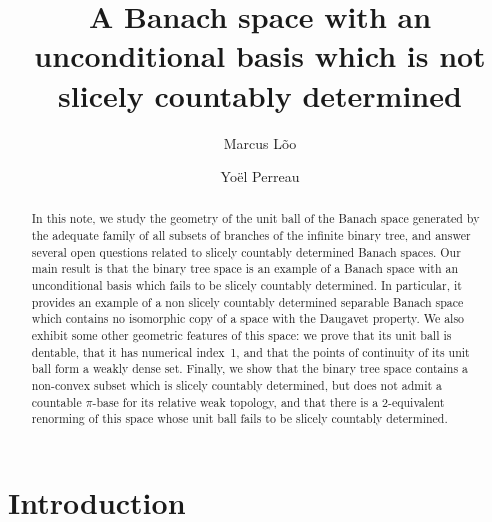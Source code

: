 \documentclass[11pt,a4paper,reqno]{amsart}
\numberwithin{equation}{section}
\newcommand{\1}{\mathbbm{1}}
\theoremstyle{plain}
\theoremstyle{definition}
\begin{document}
\title{A Banach space with an unconditional basis which is not slicely countably determined}

\author[L\~{o}o]{Marcus L\~{o}o}
\address[L\~{o}o]{Institute of Mathematics and Statistics, University of Tartu, Narva mnt 18, 51009 Tartu, Estonia}

\author[Perreau]{Yo\"el Perreau}
\address[Perreau]{Institute of Mathematics and Statistics, University of Tartu, Narva mnt 18, 51009 Tartu, Estonia}




\begin{abstract}
In this note, we study the geometry of the unit ball of the Banach space generated by the adequate family of all subsets of branches of the infinite binary tree, and answer several open questions related to slicely countably determined Banach spaces. Our main result is that the binary tree space is an example of a Banach space with an unconditional basis which fails to be slicely countably determined. In particular, it provides an example of a non slicely countably determined separable Banach space which contains no isomorphic copy of a space with the Daugavet property. We also exhibit some other geometric features of this space: we prove that its unit ball is dentable, that it has numerical index~1, and that the points of continuity of its unit ball form a weakly dense set.  Finally, we show that the binary tree space contains a non-convex subset which is slicely countably determined, but does not admit a countable $\pi$-base for its relative weak topology, and that there is a 2-equivalent renorming of this space whose unit ball fails to be slicely countably determined. 
\end{abstract}


\maketitle

\section{Introduction}
\end{document}
